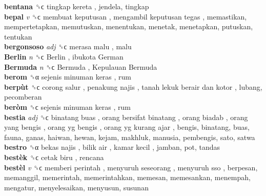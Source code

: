 \textbf{bentana} ␝ϲ   tingkap kereta , jendela, tingkap  \\
\textbf{bepal} \emph{v}  ␝ϲ   membuat keputusan ,  mengambil keputusan tegas , memastikan, mempertetapkan, memutuskan, menentukan, menetak, menetapkan, putuskan, tentukan  \\
\textbf{bergonsoso} \emph{adj}  ␝ϲ   merasa malu , malu  \\
\textbf{Berlin} \emph{n}  ␝ϲ   Berlin ,  ibukota German   \\
\textbf{Bermuda} \emph{n}  ␝ϲ   Bermuda ,  Kepulauan Bermuda   \\
\textbf{berom} ␝α   sejenis minuman keras , rum  \\
\textbf{berpùt} ␝ϲ   corong salur ,  penakung najis ,  tanah lekuk berair dan kotor , lubang, pecomberan  \\
\textbf{beròm} ␝ϲ   sejenis minuman keras , rum  \\
\textbf{bestia} \emph{adj}  ␝ϲ   binatang buas ,  orang bersifat binatang ,  orang biadab ,  orang yang bengis ,  orang yg bengis ,  orang yg kurang ajar , bengis, binatang, buas, fauna, ganas, haiwan, hewan, kejam, makhluk, manusia, pembengis, sato, satwa  \\
\textbf{bestro} ␝α   bekas najis ,  bilik air ,  kamar kecil , jamban, pot, tandas  \\
\textbf{bestèk} ␝ϲ   cetak biru , rencana  \\
\textbf{bestèl} \emph{v}  ␝ϲ   memberi perintah ,  menyuruh seseorang ,  menyuruh sso , berpesan, memanggil, memerintah, memerintahkan, memesan, memesankan, menempah, mengatur, menyelesaikan, menyusun, susunan  \\
